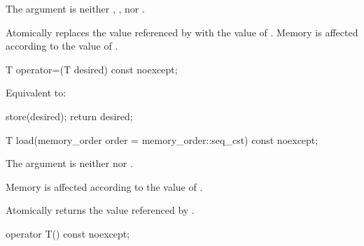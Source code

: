 \begin{itemdescr}
\pnum
\expects
The  argument is neither
,
, nor
.

\pnum
\effects
Atomically replaces the value referenced by 
with the value of .
Memory is affected according to the value of .
\end{itemdescr}

%
%
%
%
\begin{itemdecl}
T operator=(T desired) const noexcept;
\end{itemdecl}

\begin{itemdescr}
\pnum
\effects
Equivalent to:
\begin{codeblock}
store(desired);
return desired;
\end{codeblock}
\end{itemdescr}

%
%
%
%
\begin{itemdecl}
T load(memory_order order = memory_order::seq_cst) const noexcept;
\end{itemdecl}

\begin{itemdescr}
\pnum
\expects
The  argument is neither
 nor .

\pnum
\effects
Memory is affected according to the value of .

\pnum
\returns
Atomically returns the value referenced by .
\end{itemdescr}

%
%
%
%
\begin{itemdecl}
operator T() const noexcept;
\end{itemdecl}

